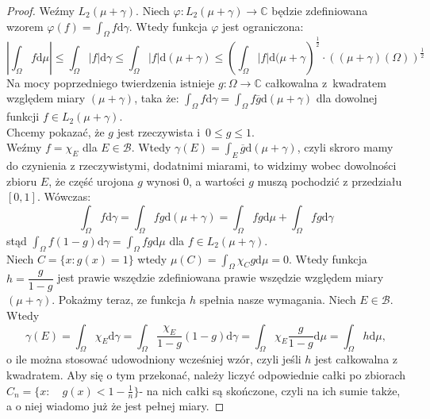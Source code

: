\documentclass[11pt]{mwrep}
\renewcommand{\[}{\begin{equation}}
\renewcommand{\]}{\end{equation}}
\newcommand{\C}{{\ensuremath{\mathbb C}}}
\newcommand{\dd}{\mathrm{d}}
\begin{document}
\begin{proof}
	Weźmy $L_2(\mu+\gamma)$. Niech $\varphi\colon L_2(\mu+\gamma) \to \C$ będzie zdefiniowana wzorem $\varphi(f) = \int_\Omega f \dd \gamma$.
	Wtedy funkcja $\varphi$ jest ograniczona: 
	$$\left| \int_\Omega f \dd \mu\right| \le \int_\Omega |f| \dd \gamma\le \int_\Omega|f|\dd(\mu+\gamma) \le 
	\left( \int_\Omega |f| \dd(\mu+\gamma \right)^\frac{1}{2}\cdot \left( (\mu+\gamma)(\Omega) \right)^\frac{1}{2} $$
	Na mocy poprzedniego twierdzenia istnieje $g\colon \Omega \to \C$ całkowalna z~kwadratem względem miary $(\mu+\gamma)$, taka że: 
	$ \int_\Omega f \dd \gamma = \int_\Omega f \overline{g} \dd (\mu+\gamma)$ dla dowolnej funkcji $f \in L_2(\mu+\gamma)$.\\
	Chcemy pokazać, że $g$ jest rzeczywista i~$0\le g\le 1$.\\
	Weźmy $f = \chi_E$ dla $E\in \mathcal{B}$. Wtedy $ \gamma(E) = \int_E \overline{g} \dd(\mu+\gamma)$, czyli skroro mamy do czynienia z rzeczywistymi, dodatnimi miarami, to widzimy wobec dowolności zbioru $E$, że część urojona $g$ wynosi $0$, a  wartości $g$ muszą pochodzić z przedziału $[0,1]$. 
	Wówczas:
	$$\int_\Omega f \dd \gamma = \int_\Omega f g \dd (\mu+ \gamma) = \int_\Omega fg \dd \mu + \int_\Omega fg \dd \gamma$$
	stąd $\int_\Omega f (1-g) \dd \gamma = \int_\Omega fg \dd \mu $ dla $f \in L_2(\mu+\gamma)$.\\
	Niech $C= \{x: g(x) = 1\}$ wtedy $\mu(C) = \int_\Omega \chi_C g \dd \mu =0$.
	Wtedy funkcja $h = \dfrac{g}{1-g}$ jest prawie wszędzie zdefiniowana prawie wszędzie względem miary $(\mu+\gamma)$. Pokażmy teraz, ze funkcja $h$ spełnia nasze wymagania.
	Niech $E \in \mathcal{B}$. Wtedy 
	$$\gamma(E) = \int_\Omega \chi_E \dd \gamma = \int_\Omega\frac{\chi_E}{1-g}(1-g)\dd \gamma = \int_\Omega \chi_E \frac{g}{1-g}\dd \mu = 
	\int_\Omega h \dd \mu,$$ o ile można stosować udowodniony wcześniej wzór, czyli jeśli $h$ jest całkowalna z kwadratem. Aby się o tym przekonać, należy liczyć odpowiednie całki po zbiorach $C_n=\{x:\quad g(x)<1-\frac{1}{n}\}$- na nich całki są skończone, czyli na ich sumie także, a o niej wiadomo już że jest pełnej miary. %
\end{proof}
\end{document}
